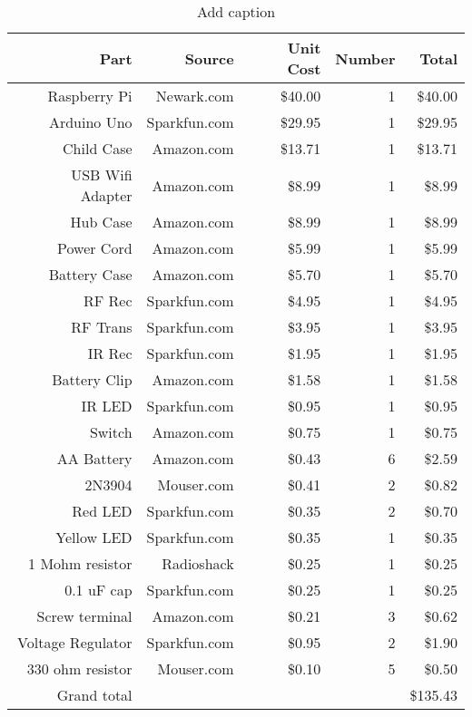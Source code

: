 \begin{table}[htbp]
  \centering
  \caption{Add caption}
    \begin{tabular}{rrrrr}
    \toprule
    Part  & Source & Unit Cost & Number  & Total \\
    \midrule
    Raspberry Pi & Newark.com & \$40.00 & 1     & \$40.00 \\
    Arduino Uno & Sparkfun.com & \$29.95 & 1     & \$29.95 \\
    Child Case & Amazon.com & \$13.71 & 1     & \$13.71 \\
    USB Wifi Adapter & Amazon.com & \$8.99 & 1     & \$8.99 \\
    Hub Case & Amazon.com & \$8.99 & 1     & \$8.99 \\
    Power Cord & Amazon.com & \$5.99 & 1     & \$5.99 \\
    Battery Case & Amazon.com & \$5.70 & 1     & \$5.70 \\
    RF Rec & Sparkfun.com & \$4.95 & 1     & \$4.95 \\
    RF Trans & Sparkfun.com & \$3.95 & 1     & \$3.95 \\
    IR Rec & Sparkfun.com & \$1.95 & 1     & \$1.95 \\
    Battery Clip & Amazon.com & \$1.58 & 1     & \$1.58 \\
    IR LED & Sparkfun.com & \$0.95 & 1     & \$0.95 \\
    Switch & Amazon.com & \$0.75 & 1     & \$0.75 \\
    AA Battery & Amazon.com & \$0.43 & 6     & \$2.59 \\
    2N3904 & Mouser.com & \$0.41 & 2     & \$0.82 \\
    Red LED & Sparkfun.com & \$0.35 & 2     & \$0.70 \\
    Yellow LED & Sparkfun.com & \$0.35 & 1     & \$0.35 \\
    1 Mohm resistor & Radioshack & \$0.25 & 1     & \$0.25 \\
    0.1 uF cap & Sparkfun.com & \$0.25 & 1     & \$0.25 \\
    Screw terminal & Amazon.com & \$0.21 & 3     & \$0.62 \\
    Voltage Regulator & Sparkfun.com & \$0.95 & 2     & \$1.90 \\
    330 ohm resistor & Mouser.com & \$0.10 & 5     & \$0.50 \\
    Grand total &       &       &       & \$135.43 \\
    \bottomrule
    \end{tabular}%
  \label{tab:addlabel}%
\end{table}%
